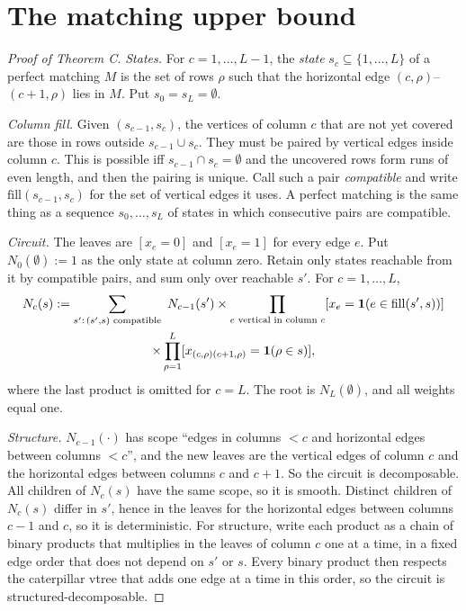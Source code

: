 \section{The matching upper bound}\label{sec:upper}

\begin{proof}[Proof of Theorem C]
\emph{States.} For $c=1,\dots,L-1$, the \emph{state} $s_c\subseteq\{1,\dots,L\}$ of a perfect matching $M$ is the set of rows $\rho$ such that the horizontal edge $(c,\rho)$--$(c+1,\rho)$ lies in $M$. Put $s_0=s_L=\emptyset$.

\emph{Column fill.} Given $(s_{c-1},s_c)$, the vertices of column $c$ that are not yet covered are those in rows outside $s_{c-1}\cup s_c$. They must be paired by vertical edges inside column $c$. This is possible iff $s_{c-1}\cap s_c=\emptyset$ and the uncovered rows form runs of even length, and then the pairing is unique. Call such a pair \emph{compatible} and write $\mathrm{fill}(s_{c-1},s_c)$ for the set of vertical edges it uses. A perfect matching is the same thing as a sequence $s_0,\dots,s_L$ of states in which consecutive pairs are compatible.

\emph{Circuit.} The leaves are $[x_e=0]$ and $[x_e=1]$ for every edge $e$. Put $N_0(\emptyset):=1$ as the only state at column zero. Retain only states reachable from it by compatible pairs, and sum only over reachable $s'$. For $c=1,\dots,L$,
\begin{multline*}
  N_c(s):=\sum_{s':\,(s',s)\text{ compatible}}\ N_{c-1}(s')\times\prod_{e\text{ vertical in column }c}[x_e=\one(e\in\mathrm{fill}(s',s))]\\
  \times\prod_{\rho=1}^L[x_{(c,\rho)(c+1,\rho)}=\one(\rho\in s)],
\end{multline*}
where the last product is omitted for $c=L$. The root is $N_L(\emptyset)$, and all weights equal one.

\emph{Structure.} $N_{c-1}(\cdot)$ has scope ``edges in columns $<c$ and horizontal edges between columns $<c$'', and the new leaves are the vertical edges of column $c$ and the horizontal edges between columns $c$ and $c+1$. So the circuit is decomposable. All children of $N_c(s)$ have the same scope, so it is smooth. Distinct children of $N_c(s)$ differ in $s'$, hence in the leaves for the horizontal edges between columns $c-1$ and $c$, so it is deterministic. For structure, write each product as a chain of binary products that multiplies in the leaves of column $c$ one at a time, in a fixed edge order that does not depend on $s'$ or $s$. Every binary product then respects the caterpillar vtree that adds one edge at a time in this order, so the circuit is structured-decomposable.


\end{proof}
